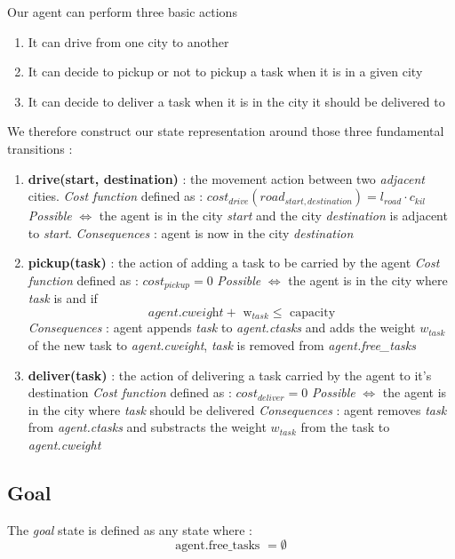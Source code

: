 \documentclass[11pt]{article}
\begin{document}
Our agent can perform three basic actions 
\begin{enumerate}
    \item It can drive from one city to another
    \item It can decide to pickup or not to pickup a task when it is in a given city
    \item It can decide to deliver a task when it is in the city it should be delivered to 
\end{enumerate}
We therefore construct our state representation around those three fundamental transitions :
\begin{enumerate}
    \item \textbf{drive(start, destination)} : the movement action between two \emph{adjacent} cities.
    \subitem \emph{Cost function} defined as : $cost_{drive}(road_{start,destination}) = l_{road} \cdot c_{kil} $
    \subitem \emph{Possible} $\iff$ the agent is in the city \emph{start} and the city \emph{destination} is adjacent to \emph{start}.
    \subitem \emph{Consequences} : agent is now in the city \emph{destination}
    \item \textbf{pickup(task)} : the action of adding a task to be carried by the agent
    \subitem \emph{Cost function} defined as : $cost_{pickup}=0$
    \subitem \emph{Possible} $\iff$ the agent is in the city where \emph{task} is and if \[\textit{agent.cweight}+\text{ w$_{task}$} \leq \text{ capacity}\]
    \subitem \emph{Consequences} : agent appends \emph{task} to \emph{agent.ctasks} and adds the weight $w_{task}$ of the new task to \emph{agent.cweight}, \emph{task} is removed from \emph{agent.free\_tasks}
    \item \textbf{deliver(task)} : the action of delivering a task carried by the agent to it's destination
    \subitem \emph{Cost function} defined as : $cost_{deliver}=0$
    \subitem \emph{Possible} $\iff$ the agent is in the city where \emph{task} should be delivered
    \subitem \emph{Consequences} : agent removes \emph{task} from \emph{agent.ctasks} and substracts the weight $w_{task}$ from the task to \emph{agent.cweight}
\end{enumerate}

\subsection{Goal}

The \emph{goal} state is defined as any state where :
\[\text{agent.free\_tasks } = \emptyset\]
\end{document}
